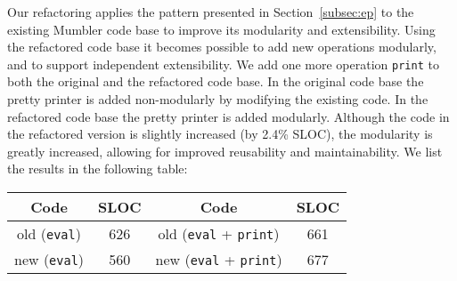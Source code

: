 Our refactoring applies the pattern presented in
Section~\ref{subsec:ep} to the existing Mumbler code base to improve
its modularity and extensibility. Using the refactored code base it
becomes possible to add new operations modularly, and to support
independent extensibility. We add one more
operation \texttt{print} to both the original and the refactored code
base. In the original code base the pretty printer is added
non-modularly by modifying the existing code. In the refactored code
base the pretty printer is added modularly. 
Although the code in the refactored version is slightly increased (by 2.4\% SLOC), the
modularity is greatly increased, allowing for improved reusability and maintainability.
We list the results in the following table:

\vspace{0.5em}
\begin{tabular}{cccc}
\hline
\rowcolor[HTML]{C0C0C0} 
Code               & SLOC & Code               & SLOC \\ \hline
old (\texttt{eval})         & 626  & old (\texttt{eval} + \texttt{print}) & 661  \\ 
\rowcolor[HTML]{C0C0C0}
new (\texttt{eval})         & 560  & new (\texttt{eval} + \texttt{print}) & 677  \\ \hline
\end{tabular}


